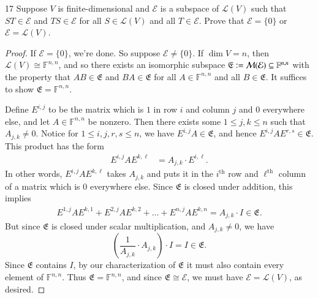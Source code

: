 \documentclass{extarticle}
\newenvironment{problem}[1]{\begin{prob*}{#1}{}}{\end{prob*}}
\newcommand{\F}{\mathbb{F}}
\newcommand{\mat}{\mathcal{M}}
\newcommand{\Hom}{\mathcal{L}}
\newcommand{\defeq}{\vcentcolon=}
\begin{document}
\begin{problem}{17}
Suppose $V$ is finite-dimensional and $\mathcal{E}$ is a subspace of $\Hom(V)$ such that $ST\in\mathcal{E}$ and $TS \in\mathcal{E}$ for all $S\in\Hom(V)$ and all $T\in\mathcal{E}$.  Prove that $\mathcal{E}=\{0\}$ or $\mathcal{E}=\Hom(V)$.  
\end{problem}
\begin{proof}
If $\mathcal{E}=\{0\}$, we're done.  So suppose $\mathcal{E}\neq \{0\}$.  If $\dim V= n$, then $\Hom(V)\cong \F^{n,n}$, and so there exists an isomorphic subspace $\mathfrak{E}\defeq\mat(\mathcal{E})\subseteq\F^{n,n}$ with the property that $AB\in \mathfrak{E}$ and $BA\in \mathfrak{E}$ for all $A\in \F^{n,n}$ and all $B\in \mathfrak{E}$.  It suffices to show $\mathfrak{E} = \F^{n,n}$.  
\par  Define $E^{i,j}$ to be the matrix which is $1$ in row $i$ and column $j$ and $0$ everywhere else, and let $A\in\F^{n,n}$ be nonzero.  Then there exists some $1\leq j,k\leq n$ such that $A_{j,k}\neq 0$.  Notice for $1\leq i,j,r,s\leq n$, we have $E^{i,j}A\in \mathfrak{E}$, and hence $E^{i,j}AE^{r,s}\in\mathfrak{E}$. This product has the form
\begin{align*}
E^{i,j}AE^{k,\ell} &= A_{j,k}\cdot E^{i,\ell}.
\end{align*}
In other words, $E^{i,j}AE^{k,\ell}$ takes $A_{j,k}$ and puts it in the $i^{\text{th}}$ row and $\ell^{\text{th}}$ column of a matrix which is $0$ everywhere else.  Since $\mathfrak{E}$ is closed under addition, this implies
\begin{align*}
E^{1,j}AE^{k,1} + E^{2,j}AE^{k,2} + \dots +  E^{n,j}AE^{k,n} = A_{j,k}\cdot I\in \mathfrak{E}. 
\end{align*}
But since $\mathfrak{E}$ is closed under scalar multiplication, and $A_{j,k}\neq 0$, we have
\begin{equation*}
\left(\frac{1}{A_{j,k}}\cdot A_{j,k}\right) \cdot I = I \in \mathfrak{E}.
\end{equation*}
Since $\mathfrak{E}$ contains $I$, by our characterization of $\mathfrak{E}$ it must also contain every element of $\F^{n,n}$.  Thus $\mathfrak{E}=\F^{n,n}$, and since $\mathfrak{E}\cong \mathcal{E}$, we must have $\mathcal{E} = \Hom(V)$, as desired.
\end{proof}
\end{document}
